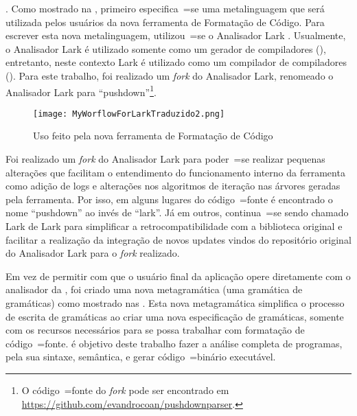 .
Como mostrado na ,
primeiro especifica~=se uma metalinguagem que será utilizada pelos usuários da nova ferramenta de Formatação de Código.
Para escrever esta nova metalinguagem,
utilizou~=se o Analisador Lark \cite{larkContextualLexer}.
Usualmente,
o Analisador Lark é utilizado somente como um gerador de compiladores (),
entretanto,
neste contexto Lark é utilizado como um compilador de compiladores ().
Para este trabalho,
foi realizado um \textit{fork} \cite{overviewOfGitHubForks,mayTheForkBeWithYou,collaborationAmongGitHubUsers} do Analisador Lark,
renomeado o Analisador Lark para ``pushdown''\footnote{%
O código~=fonte do \textit{fork} pode ser encontrado em \url{https://github.com/evandrocoan/pushdownparser}.
}.
\begin{figure}[!htb]
\caption{Uso feito pela nova ferramenta de Formatação de Código}
\label{MyWorflowForLarkTraduzido2}
\centering
\texttt{[image: MyWorflowForLarkTraduzido2.png]}
\end{figure}

Foi realizado um \textit{fork} do Analisador Lark para poder~=se realizar pequenas alterações que facilitam o entendimento do funcionamento interno da ferramenta como adição de logs e
alterações nos algoritmos de iteração nas árvores geradas pela ferramenta.
Por isso,
em alguns lugares do código~=fonte é encontrado o nome ``pushdown'' ao invés de ``lark''.
Já em outros,
continua~=se sendo chamado Lark de Lark para simplificar a retrocompatibilidade com a biblioteca original e
facilitar a realização da integração de novos updates vindos do repositório original do Analisador Lark para o \textit{fork} realizado.

Em vez de permitir com que o usuário final da aplicação opere diretamente com o analisador da ,
foi criado uma nova metagramática (uma gramática de gramáticas) como mostrado nas .
Esta nova metagramática simplifica o processo de escrita de gramáticas ao criar uma nova especificação de gramáticas,
somente com os recursos necessários para se possa trabalhar com formatação de código~=fonte.
é objetivo deste trabalho fazer a análise completa de programas,
pela sua sintaxe, semântica,
e gerar código~=binário executável.

